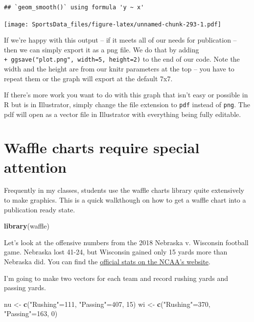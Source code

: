 \documentclass[
]{book}
\newenvironment{Shaded}{\begin{snugshade}}{\end{snugshade}}
\newcommand{\DecValTok}[1]{\textcolor[rgb]{0.00,0.00,0.81}{#1}}
\newcommand{\KeywordTok}[1]{\textcolor[rgb]{0.13,0.29,0.53}{\textbf{#1}}}
\newcommand{\NormalTok}[1]{#1}
\newcommand{\StringTok}[1]{\textcolor[rgb]{0.31,0.60,0.02}{#1}}
\begin{document}
\begin{verbatim}
## `geom_smooth()` using formula 'y ~ x'
\end{verbatim}

\texttt{[image: SportsData\_files/figure-latex/unnamed-chunk-293-1.pdf]}

If we're happy with this output -- if it meets all of our needs for publication -- then we can simply export it as a png file. We do that by adding \texttt{+\ ggsave("plot.png",\ width=5,\ height=2)} to the end of our code. Note the width and the height are from our knitr parameters at the top -- you have to repeat them or the graph will export at the default 7x7.

If there's more work you want to do with this graph that isn't easy or possible in R but is in Illustrator, simply change the file extension to \texttt{pdf} instead of \texttt{png}. The pdf will open as a vector file in Illustrator with everything being fully editable.

\hypertarget{waffle-charts-require-special-attention}{%
\section{Waffle charts require special attention}\label{waffle-charts-require-special-attention}}

Frequently in my classes, students use the waffle charts library quite extensively to make graphics. This is a quick walkthough on how to get a waffle chart into a publication ready state.

\begin{Shaded}
\begin{Highlighting}[]
\KeywordTok{library}\NormalTok{(waffle)}
\end{Highlighting}
\end{Shaded}

Let's look at the offensive numbers from the 2018 Nebraska v. Wisconsin football game. Nebraska lost 41-24, but Wisconsin gained only 15 yards more than Nebraska did. You can find the \href{https://www.ncaa.com/game/football/fbs/2018/10/06/nebraska-wisconsin/team-stats}{official stats on the NCAA's website}.

I'm going to make two vectors for each team and record rushing yards and passing yards.

\begin{Shaded}
\begin{Highlighting}[]
\NormalTok{nu <-}\StringTok{ }\KeywordTok{c}\NormalTok{(}\StringTok{"Rushing"}\NormalTok{=}\DecValTok{111}\NormalTok{, }\StringTok{"Passing"}\NormalTok{=}\DecValTok{407}\NormalTok{, }\DecValTok{15}\NormalTok{)}
\NormalTok{wi <-}\StringTok{ }\KeywordTok{c}\NormalTok{(}\StringTok{"Rushing"}\NormalTok{=}\DecValTok{370}\NormalTok{, }\StringTok{"Passing"}\NormalTok{=}\DecValTok{163}\NormalTok{, }\DecValTok{0}\NormalTok{)}
\end{Highlighting}
\end{Shaded}
\end{document}
